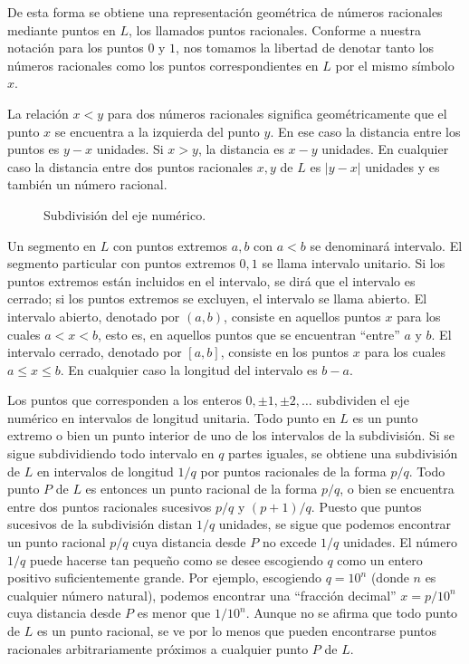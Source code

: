 \documentclass[12pt]{book}
\theoremstyle{definition}
\begin{document}
De esta forma se obtiene una representación geométrica de números racionales mediante puntos en $L$, los llamados puntos racionales. Conforme a nuestra notación para los puntos $0$ y $1$, nos tomamos la libertad de denotar tanto los números racionales como los puntos correspondientes en $L$ por el mismo símbolo $x$.

La relación $x < y$ para dos números racionales significa geométricamente que el punto $x$ se encuentra a la izquierda del punto $y$. En ese caso la distancia entre los puntos es $y - x$ unidades. Si $x > y$, la distancia es $x - y$ unidades. En cualquier caso la distancia entre dos puntos racionales $x, y$ de $L$ es $|y - x|$ unidades y es también un número racional.

\begin{figure}[h]
\centering
\caption{Subdivisión del eje numérico.}
\end{figure}

Un segmento en $L$ con puntos extremos $a, b$ con $a < b$ se denominará intervalo. El segmento particular con puntos extremos $0, 1$ se llama intervalo unitario. Si los puntos extremos están incluidos en el intervalo, se dirá que el intervalo es cerrado; si los puntos extremos se excluyen, el intervalo se llama abierto. El intervalo abierto, denotado por $(a, b)$, consiste en aquellos puntos $x$ para los cuales $a < x < b$, esto es, en aquellos puntos que se encuentran ``entre'' $a$ y $b$. El intervalo cerrado, denotado por $[a, b]$, consiste en los puntos $x$ para los cuales $a \le x \le b$. En cualquier caso la longitud del intervalo es $b - a$.

Los puntos que corresponden a los enteros $0, \pm 1, \pm 2, \dots$ subdividen el eje numérico en intervalos de longitud unitaria. Todo punto en $L$ es un punto extremo o bien un punto interior de uno de los intervalos de la subdivisión. Si se sigue subdividiendo todo intervalo en $q$ partes iguales, se obtiene una subdivisión de $L$ en intervalos de longitud $1/q$ por puntos racionales de la forma $p/q$. Todo punto $P$ de $L$ es entonces un punto racional de la forma $p/q$, o bien se encuentra entre dos puntos racionales sucesivos $p/q$ y $(p+1)/q$. Puesto que puntos sucesivos de la subdivisión distan $1/q$ unidades, se sigue que podemos encontrar un punto racional $p/q$ cuya distancia desde $P$ no excede $1/q$ unidades. El número $1/q$ puede hacerse tan pequeño como se desee escogiendo $q$ como un entero positivo suficientemente grande. Por ejemplo, escogiendo $q = 10^n$ (donde $n$ es cualquier número natural), podemos encontrar una ``fracción decimal'' $x = p/10^n$ cuya distancia desde $P$ es menor que $1/10^n$. Aunque no se afirma que todo punto de $L$ es un punto racional, se ve por lo menos que pueden encontrarse puntos racionales arbitrariamente próximos a cualquier punto $P$ de $L$.
\end{document}
